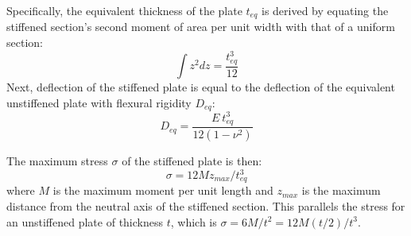 Specifically, the equivalent thickness of the plate $t_{eq}$ is derived by equating the stiffened section's second moment of area per unit width with that of a uniform section:
\begin{equation}
    \int z^2dz = \frac{t_{eq}^3}{12}
\end{equation}
Next, deflection of the stiffened plate is equal to the deflection of the equivalent unstiffened plate with flexural rigidity $D_{eq}$:
\begin{equation}
    D_{eq} = \frac{E~  t_{eq}^3}{12(1-\nu^2)}
\end{equation}

The maximum stress $\sigma$ of the stiffened plate is then:
\begin{equation}\label{eq:plate-stress}
    \sigma= 12M z_{max}/t_{eq}^3
\end{equation}
where $M$ is the maximum moment per unit length and $z_{max}$ is the maximum distance from the neutral axis of the stiffened section.
This parallels the stress for an unstiffened plate of thickness $t$, which is $\sigma=6M/t^2 = 12 M(t/2)/t^3$.

